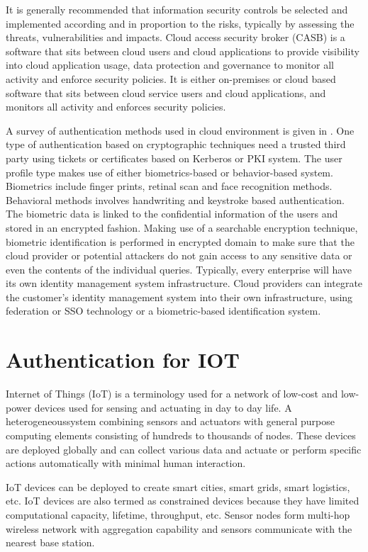 \begin{multicols}{2}
It is generally recommended that information security controls be selected and implemented according and in proportion to the risks, typically by assessing the threats, vulnerabilities and impacts. Cloud access security broker (CASB) is a software that sits between cloud users and cloud applications to provide visibility into cloud application usage, data protection and governance to monitor all activity and enforce security policies. It is either on-premises or cloud based software that sits between cloud service users and cloud applications, and monitors all activity and enforces security policies. 

A survey of authentication methods used in cloud environment is given in \cite{chap2-key18}. One type of authentication based on cryptographic techniques need a trusted third party using tickets or certificates based on Kerberos or PKI system. The user profile type makes use of either biometrics-based or behavior-based system. Biometrics include finger prints, retinal scan and face recognition methods. Behavioral methods involves handwriting and keystroke based authentication. The biometric data is linked to the confidential information of the users and stored in an encrypted fashion. Making use of a searchable encryption technique, biometric identification is performed in encrypted domain to make sure that the cloud provider or potential attackers do not gain access to any sensitive data or even the contents of the individual queries. Typically, every enterprise will have its own identity management system infrastructure. Cloud providers can integrate the customer's identity management system into their own infrastructure, using federation or SSO technology or a biometric-based identification system.

\section*{Authentication for IOT}

Internet of Things (IoT) is a terminology used for a network of low-cost and low-power devices used for sensing and actuating in day to day life. A heterogeneous\break system combining sensors and actuators with general purpose computing elements consisting of hundreds to thousands of nodes. These devices are deployed globally and can collect various data and actuate or perform specific actions automatically with minimal human interaction.

IoT devices can be deployed to create smart cities, smart grids, smart logistics, etc. IoT devices are also termed as constrained devices because they have limited computational capacity, lifetime, throughput, etc. Sensor nodes form multi-hop wireless network with aggregation capability and sensors communicate with the nearest base station. 


\end{multicols}

